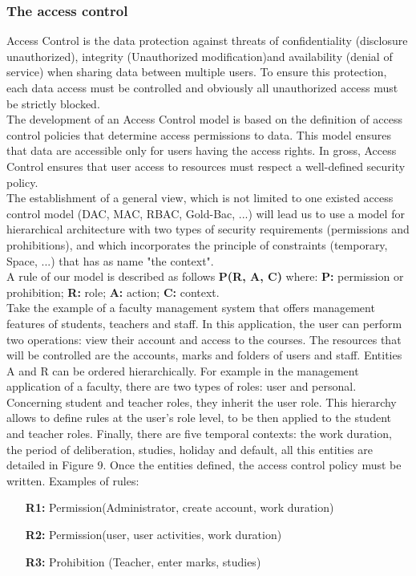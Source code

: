 \documentclass{acm_proc_article-sp}
\begin{document}
\subsubsection{The access control}
Access Control is the data protection against threats of confidentiality (disclosure unauthorized), integrity (Unauthorized modification)and availability (denial of service) when sharing data between multiple users.
To ensure this protection, each data access must be controlled and obviously all unauthorized access must be strictly blocked.\\
The development of an Access Control model is based on the definition of access control policies that determine access permissions to data. This model ensures that data are accessible only for users having the access rights. In gross, Access Control ensures that user access to resources must respect a well-defined security policy.\\
The establishment of a general view, which is not limited to one existed access control model (DAC, MAC, RBAC, Gold-Bac, ...) will lead us to use a model for hierarchical architecture with two types of security requirements (permissions and prohibitions), and which incorporates the principle of constraints (temporary, Space, ...) that has as name "the context".\\
A rule of our model is described as follows \textbf{P(R, A, C)} where: \textbf{P:} permission or prohibition; \textbf{R:} role; \textbf{A:} action; \textbf{C:} context.\\
Take the example of a faculty management system that offers management features of students, teachers and staff.
In this application, the user can perform two operations: view their account and access to the courses. The resources that will be controlled are the accounts, marks and folders of users and staff. Entities A and R can be ordered hierarchically. For example in the management application of a faculty, there are two types of roles: user and personal. Concerning student and teacher roles, they inherit the user role. This hierarchy allows to define rules at the user's role level, to be then applied to the student and teacher roles. Finally, there are five temporal contexts: the work duration, the period of deliberation, studies, holiday and default, all this entities are detailed in Figure 9. Once the entities defined, the access control policy must be written. Examples of rules:
\begin{itemize}
 \item[\textbf{R1:}] Permission(Administrator, create account, work duration)
 \item[\textbf{R2:}] Permission(user, user activities, work duration)
 \item[\textbf{R3:}] Prohibition (Teacher, enter marks, studies)
\end{itemize}
\end{document}
